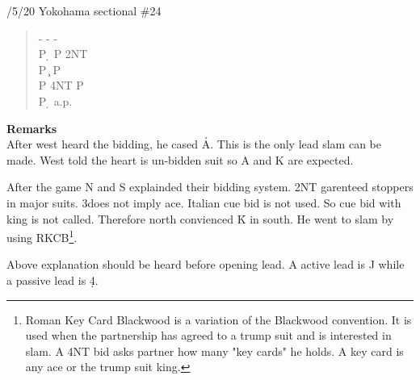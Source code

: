 \vspace{0.5cm}
/5/20 Yokohama sectional \#24
\begin{quote}
%
  {}%
  {}
  {}%
  {}%
\end{quote}
\begin{quote}
\begin{bidding}
- \> -  \> - \d \\
P \d \> P \> 2NT\\
P \c \> P \s \\
P \> 4NT \> P \s \\
P \d \> a.p.
\end{bidding}
\end{quote}
{\bf Remarks}\\

After west heard the bidding, he cased \h A. This is the only lead slam
can be made. West told the heart is un-bidden suit so A and K are expected.

After the game N and S explainded their bidding system.
2NT garenteed stoppers in major suits. 3\s does not imply ace. Italian cue 
bid is not used. So cue bid with king is not called. Therefore north convienced
\h K in south. He went to slam by using 
RKCB\footnote{
Roman Key Card Blackwood is a variation of the Blackwood convention. It is used when the partnership has agreed to a trump suit and is interested in slam. A 4NT bid asks partner how many "key cards" he holds. A key card is any ace or the trump suit king.
}.

Above explanation should be heard before opening lead. A active lead is
\s J while a passive lead is \d 4.

